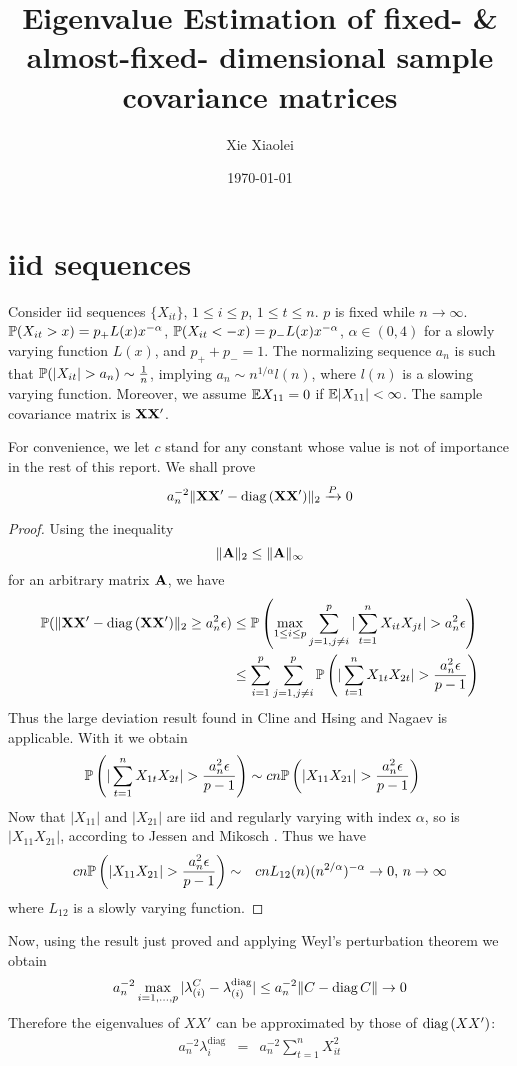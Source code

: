 \documentclass{article}
\title{Eigenvalue Estimation of fixed- \& almost-fixed- dimensional
  sample covariance matrices}
\author{Xie Xiaolei}
\date{\today}
\begin{document}
\maketitle
\section{iid sequences}\label{sec:iid}
Consider iid sequences $\{X_{it}\}$, $1 \leq i \leq p$, $1 \leq t \leq
n$. $p$ is fixed while $n \to \infty$. $\mathbb{P}(X_{it} > x) = p_+ L(x)
x^{-\alpha}$, $\mathbb{P}(X_{it} < -x) = p_- L(x) x^{-\alpha}$, $\alpha \in
(0,4)$ for a slowly varying function $L(x)$, and $p_+ + p_- = 1$. The
normalizing sequence $a_n$ is such that $\mathbb{P}(|X_{it}| > a_n) \sim {1
  \over n}$, implying $a_n \sim n^{1/\alpha} l(n)$, where $l(n)$ is a
slowing varying function. Moreover, we assume $\mathbb{E} X_{11} = 0$ if $\mathbb{E}
|X_{11}| < \infty$. The sample covariance matrix is $\mathbf{XX'}$.

For convenience, we let $c$ stand for any constant whose value is not
of importance in the rest of this report. We shall prove
\[
a_n^{-2}\|\mathbf{XX'} - \text{diag\,}(\mathbf{XX'})\|_2 \xrightarrow{P} 0
\]

\begin{proof}
  Using the inequality
  \[
  \|\mathbf{A}\|_2 \leq \|\mathbf{A}\|_\infty
  \]
  for an arbitrary matrix $\mathbf{A}$, we have
  \begin{align*}
    \mathbb{P}(\|\mathbf{XX'} - \text{diag\,}(\mathbf{XX'})\|_2 \geq a_n^2 \epsilon) & \leq
    \mathbb{P}\left(\max_{1\leq i \leq p} \sum_{j=1, j\neq i}^p |\sum_{t=1}^n
    X_{it} X_{jt}| > a_n^2 \epsilon\right) \\
    &\leq \sum_{i=1}^p \sum_{j=1, j\neq i}^p \mathbb{P}\left(|\sum_{t=1}^n
    X_{1t} X_{2t}| > {a_n^2 \epsilon \over p-1}\right) \\
  \end{align*}
  Thus the large deviation result found in Cline and Hsing
  \cite{ClingHsing1998} and Nagaev \cite{nagaev1979} is
  applicable. With it we obtain
  \begin{align*}
    \mathbb{P}\left(|\sum_{t=1}^n X_{1t} X_{2t}| > {a_n^2 \epsilon \over p-1}\right)
    &\sim
    c n \mathbb{P}\left(|X_{11} X_{21}| > {a_n^2 \epsilon \over p-1 }\right)
  \end{align*}
  Now that $|X_{11}|$ and $|X_{21}|$ are iid and regularly varying
  with index $\alpha$, so is $|X_{11} X_{21}|$, according to Jessen
  and Mikosch \cite{JessenMikosch2006}. Thus we have
  \begin{eqnarray*}
    c n \mathbb{P}\left(|X_{11} X_{21}| > {a_n^2 \epsilon \over p-1 }\right)
    &\sim& c n L_{12}(n) (n^{2/\alpha})^{-\alpha} \to 0\text{,  }n\to\infty
  \end{eqnarray*}
  where $L_{12}$ is a slowly varying function.
\end{proof}
Now, using the result just proved and applying Weyl's perturbation
theorem we obtain
\[
a_n^{-2} \max_{i=1,\dots,p} |\lambda^C_{(i)} -
\lambda^{\text{diag}}_{(i)}| \leq  a_n^{-2}\|C - \text{diag\,}{C}\| \to 0
\]
Therefore the eigenvalues of $XX'$ can be approximated by those of
$\text{diag\,}(XX')$:
\begin{eqnarray*}
a_n^{-2}\lambda^{\text{diag}}_{i}  &=& a_n^{-2} \sum_{t=1}^n X_{it}^2
\end{eqnarray*}
\end{document}
